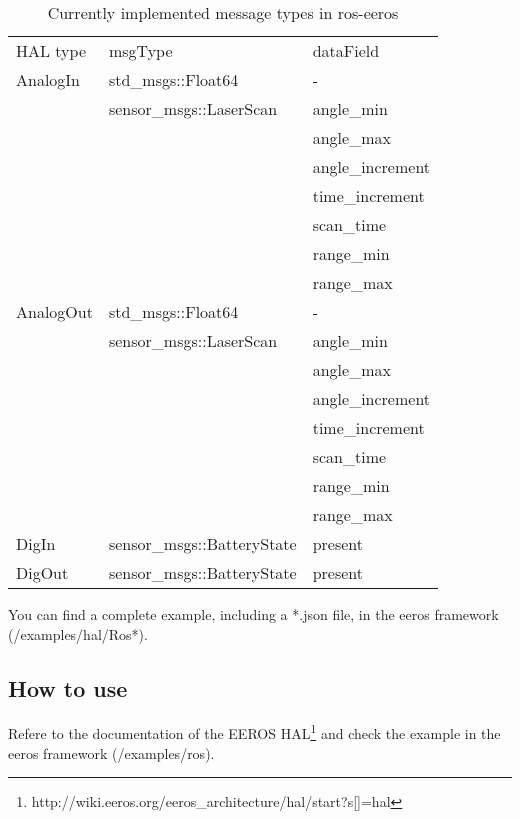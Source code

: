 \begin{table}[]
\centering
\caption{Currently implemented message types in ros-eeros}
\label{tableImplementedMsgTypes}
\begin{tabular}{lll}
\cline{2-3}
HAL type  & msgType                    & dataField        \\ \cline{2-3} 
AnalogIn  & std\_msgs::Float64         & -                \\
          & sensor\_msgs::LaserScan    & angle\_min       \\
          &                            & angle\_max       \\
          &                            & angle\_increment \\
          &                            & time\_increment  \\
          &                            & scan\_time       \\
          &                            & range\_min       \\
          &                            & range\_max       \\
AnalogOut & std\_msgs::Float64         & -                \\
          & sensor\_msgs::LaserScan    & angle\_min       \\
          &                            & angle\_max       \\
          &                            & angle\_increment \\
          &                            & time\_increment  \\
          &                            & scan\_time       \\
          &                            & range\_min       \\
          &                            & range\_max       \\
DigIn     & sensor\_msgs::BatteryState & present          \\
DigOut    & sensor\_msgs::BatteryState & present          \\ \cline{2-3} 
\end{tabular}
\end{table}

You can find a complete example, including a *.json file, in the eeros framework (/examples/hal/Ros*).


\subsection{How to use}
Refere to the documentation of the EEROS HAL\footnote{http://wiki.eeros.org/eeros\_architecture/hal/start?s[]=hal} and check the example in the eeros framework (/examples/ros).

